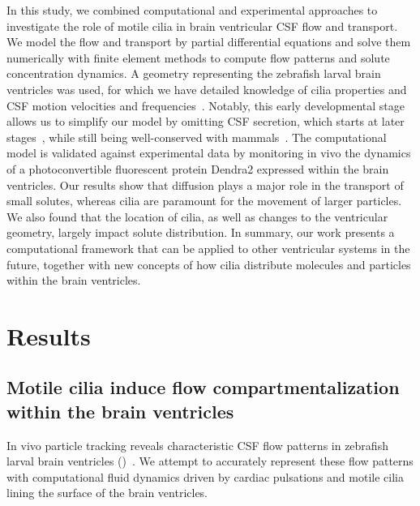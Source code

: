 \documentclass{WileyMSP-template}
\begin{document}
In this study, we combined computational and experimental approaches to investigate
the role of motile cilia in brain ventricular CSF flow and transport.
We model the flow and transport by partial differential equations and solve
them numerically with finite element methods to compute flow patterns and
solute concentration dynamics. A geometry representing the zebrafish larval brain ventricles
was used, for which we have detailed knowledge of cilia properties and CSF motion velocities
and frequencies~\cite{Olstad2019CiliaryDevelopment}. 
Notably, this early developmental stage allows us to simplify our model
by omitting CSF secretion, which starts at later stages~\cite{Jeong2024TheZebrafish},
while still being well-conserved with mammals~\cite{DGama2025MotileBrain,
Olstad2019CiliaryDevelopment, Ringers2020Role, DGama2021Diversity, jurisch2020radial}. 
The computational model is validated against experimental data by monitoring in vivo
the dynamics of a photoconvertible fluorescent protein Dendra2
expressed within the brain ventricles.
Our results show that diffusion plays a major role in the transport of small solutes,
whereas cilia are paramount for the movement of larger particles.
We also found that the location of cilia, as well as changes to the ventricular geometry,
largely impact solute distribution.
In summary, our work presents a computational
framework that can be applied to other
ventricular systems in the future, together with new concepts
of how cilia distribute molecules and
particles within the brain ventricles. 

\section{Results}

\subsection{Motile cilia induce flow compartmentalization within the brain ventricles}


In vivo particle tracking reveals characteristic CSF flow patterns in
zebrafish larval brain ventricles
()~\cite{Olstad2019CiliaryDevelopment}.
We attempt to accurately represent these flow patterns with
computational fluid dynamics driven by cardiac pulsations and motile
cilia lining the surface of the brain ventricles.
\end{document}
